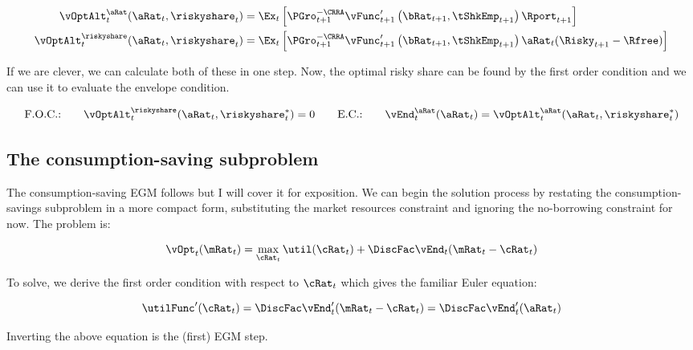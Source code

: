 \documentclass[\econtexRoot/SequentialEGM]{subfiles}
\begin{document}
\begin{equation}
	\begin{split}
		\vOptAlt_{t}^{\aRat}(\aRat_{t}, \riskyshare_{t}) & =  \Ex_{t} \left[ \PGro_{t+1}^{-\CRRA} \vFunc_{t+1}'\left(\bRat_{t+1}, \tShkEmp_{t+1}\right) \Rport_{t+1}   \right] \\
		\vOptAlt_{t}^{\riskyshare}(\aRat_{t}, \riskyshare_{t}) & =  \Ex_{t} \left[ \PGro_{t+1}^{-\CRRA} \vFunc_{t+1}'\left(\bRat_{t+1}, \tShkEmp_{t+1}\right) \aRat_{t} (\Risky_{t+1} - \Rfree)   \right] \\
	\end{split}
\end{equation}

If we are clever, we can calculate both of these in one step. Now, the optimal risky share can be found by the first order condition and we can use it to evaluate the envelope condition.

\begin{equation}
	\text{F.O.C.:} \qquad \vOptAlt_{t}^{\riskyshare}(\aRat_{t}, \riskyshare_{t}^{*})  = 0 \qquad
	\text{E.C.:} \qquad \vEnd_{t}^{\aRat}(\aRat_{t}) = \vOptAlt_{t}^{\aRat}(\aRat_{t}, \riskyshare_{t}^{*})
\end{equation}

\subsection{The consumption-saving subproblem}

The consumption-saving EGM follows \cite{Carroll2006-wq} but I will cover it for exposition. We can begin the solution process by restating the consumption-savings subproblem in a more compact form, substituting the market resources constraint and ignoring the no-borrowing constraint for now. The problem is:

\begin{equation}
	\vOpt_{t}(\mRat_{t}) = \max_{\cRat_{t}} \util(\cRat_{t}) +
	\DiscFac \vEnd_{t}(\mRat_{t}-\cRat_{t})
\end{equation}

To solve, we derive the first order condition with respect to $\cRat_{t}$ which gives the familiar Euler equation:

\begin{equation}
	\utilFunc'(\cRat_t) = \DiscFac \vEnd_{t}'(\mRat_{t} - \cRat_{t}) = \DiscFac
	\vEnd_{t}'(\aRat_{t})
\end{equation}

Inverting the above equation is the (first) EGM step.
\end{document}
